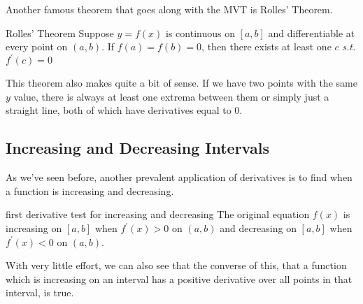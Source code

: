 Another famous theorem that goes along with the MVT is Rolles' Theorem.

\begin{theorem}{Rolles' Theorem}
    Suppose \( y = f \left( x \right) \) is continuous on \( \left[a, b \right] \) and differentiable at every point on \( \left(a, b \right) \). If \( f \left( a \right) = f \left( b \right) = 0 \), then there exists at least one \( c \) \textit{s.t.} \( f^\prime \left( c \right) = 0 \)
\end{theorem}

This theorem also makes quite a bit of sense. If we have two points with the same \( y \) value, there is always at least one extrema between them or simply just a straight line, both of which have derivatives equal to \( 0 \).

\subsection{Increasing and Decreasing Intervals}

As we've seen before, another prevalent application of derivatives is to find when a function is increasing and decreasing.

\begin{theorem}{first derivative test for increasing and decreasing}
    The original equation \( f \left( x \right) \) is increasing on \( \left[a, b \right] \) when \( f^\prime \left( x \right) > 0 \) on \( \left(a, b \right) \) and decreasing on \( \left[a, b \right] \) when \( f^\prime \left( x \right) < 0 \) on \( \left(a, b \right) \).
\end{theorem}

With very little effort, we can also see that the converse of this, that a function which is increasing on an interval has a positive derivative over all points in that interval, is true.

